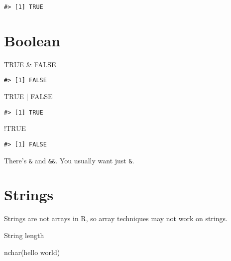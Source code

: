 \documentclass[
]{book}
\newenvironment{Shaded}{\begin{snugshade}}{\end{snugshade}}
\newcommand{\ConstantTok}[1]{\textcolor[rgb]{0.00,0.00,0.00}{#1}}
\newcommand{\FunctionTok}[1]{\textcolor[rgb]{0.00,0.00,0.00}{#1}}
\newcommand{\NormalTok}[1]{#1}
\newcommand{\SpecialCharTok}[1]{\textcolor[rgb]{0.00,0.00,0.00}{#1}}
\newcommand{\StringTok}[1]{\textcolor[rgb]{0.31,0.60,0.02}{#1}}
\begin{document}
\begin{verbatim}
#> [1] TRUE
\end{verbatim}

\hypertarget{boolean}{%
\section{Boolean}\label{boolean}}

\begin{Shaded}
\begin{Highlighting}[]
\ConstantTok{TRUE} \SpecialCharTok{\&} \ConstantTok{FALSE}
\end{Highlighting}
\end{Shaded}

\begin{verbatim}
#> [1] FALSE
\end{verbatim}

\begin{Shaded}
\begin{Highlighting}[]
\ConstantTok{TRUE} \SpecialCharTok{|} \ConstantTok{FALSE}
\end{Highlighting}
\end{Shaded}

\begin{verbatim}
#> [1] TRUE
\end{verbatim}

\begin{Shaded}
\begin{Highlighting}[]
\SpecialCharTok{!}\ConstantTok{TRUE}
\end{Highlighting}
\end{Shaded}

\begin{verbatim}
#> [1] FALSE
\end{verbatim}

There's \texttt{\&} and \texttt{\&\&}. You usually want just \texttt{\&}.

\hypertarget{strings}{%
\section{Strings}\label{strings}}

Strings are not arrays in R, so array techniques may not work on strings.

String length

\begin{Shaded}
\begin{Highlighting}[]
\FunctionTok{nchar}\NormalTok{(}\StringTok{\textquotesingle{}hello world\textquotesingle{}}\NormalTok{)}
\end{Highlighting}
\end{Shaded}
\end{document}
